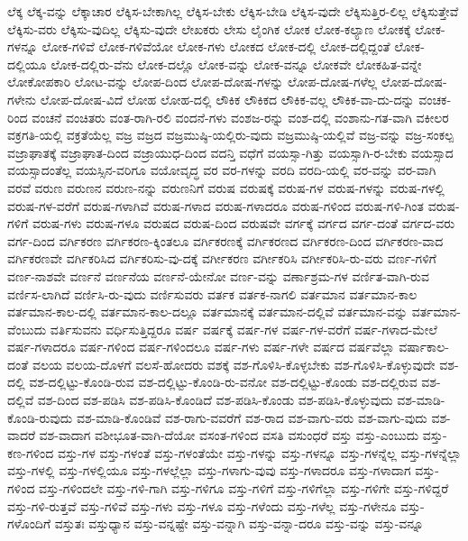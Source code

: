 {ಲೆಕ್ಕ
ಲೆಕ್ಕ-ವನ್ನು
ಲೆಕ್ಕಾಚಾರ
ಲೆಕ್ಕಿಸ-ಬೇಕಾಗಿಲ್ಲ
ಲೆಕ್ಕಿಸ-ಬೇಕು
ಲೆಕ್ಕಿಸ-ಬೇಡಿ
ಲೆಕ್ಕಿಸ-ವುದೇ
ಲೆಕ್ಕಿಸುತ್ತಿರ-ಲಿಲ್ಲ
ಲೆಕ್ಕಿಸುತ್ತೇವೆ
ಲೆಕ್ಕಿಸು-ವರು
ಲೆಕ್ಕಿಸು-ವುದಿಲ್ಲ
ಲೆಕ್ಕಿಸು-ವುದೇ
ಲೇಖಕರು
ಲೇಸು
ಲೈಂಗಿಕ
ಲೋಕ
ಲೋಕ-ಕಲ್ಯಾಣ
ಲೋಕಕ್ಕೆ
ಲೋಕ-ಗಳನ್ನೂ
ಲೋಕ-ಗಳಿವೆ
ಲೋಕ-ಗಳಿವೆಯೋ
ಲೋಕ-ಗಳು
ಲೋಕದ
ಲೋಕ-ದಲ್ಲಿ
ಲೋಕ-ದಲ್ಲಿದ್ದಂತೆ
ಲೋಕ-ದಲ್ಲಿಯೂ
ಲೋಕ-ದಲ್ಲಿರು-ವೆನು
ಲೋಕ-ದಲ್ಲೊ
ಲೋಕ-ವನ್ನು
ಲೋಕ-ವನ್ನೂ
ಲೋಕವೇ
ಲೋಕಹಿತ-ವನ್ನೇ
ಲೋಕೋಪಕಾರಿ
ಲೋಟ-ವನ್ನು
ಲೋಪ-ದಿಂದ
ಲೋಪ-ದೋಷ-ಗಳನ್ನು
ಲೋಪ-ದೋಷ-ಗಳೆಲ್ಲ
ಲೋಪ-ದೋಷ-ಗಳೇನು
ಲೋಪ-ದೋಷ-ವಿದೆ
ಲೋಹ
ಲೋಹ-ದಲ್ಲಿ
ಲೌಕಿಕ
ಲೌಕಿಕದ
ಲೌಕಿಕ-ವಲ್ಲ
ಲೌಕಿಕ-ವಾ-ದು-ದನ್ನು
ವಂಚಕ-ರಿಂದ
ವಂಚನೆ
ವಂಚಿತರು
ವಂತ-ರಾಗಿ-ರಲಿ
ವಂದನೆ-ಗಳು
ವಂಶಜ-ರನ್ನು
ವಂಶ-ದಲ್ಲಿ
ವಂಶಾನು-ಗತ-ವಾಗಿ
ವಕೀಲರ
ವಕ್ರಗತಿ-ಯಲ್ಲಿ
ವಕ್ರತೆಯೆಲ್ಲ
ವಜ್ರ
ವಜ್ರದ
ವಜ್ರಮುಷ್ಠಿ-ಯಲ್ಲಿರು-ವುದು
ವಜ್ರಮುಷ್ಠಿ-ಯಲ್ಲಿವೆ
ವಜ್ರ-ವನ್ನು
ವಜ್ರ-ಸಂಕಲ್ಪ
ವಜ್ರಾಘಾತಕ್ಕೆ
ವಜ್ರಾಘಾತ-ದಿಂದ
ವಜ್ರಾಯುಧ-ದಿಂದ
ವದನ್ತಿ
ವಧೆಗೆ
ವಯಸ್ಸಾ-ಗಿತ್ತು
ವಯಸ್ಸಾಗಿ-ರ-ಬೇಕು
ವಯಸ್ಸಾದ
ವಯಸ್ಸಾದಂತೆಲ್ಲ
ವಯಸ್ಸಿನ-ವರಿಗೂ
ವಯೋವೃದ್ಧ
ವರ
ವರ-ಗಳನ್ನು
ವರದಿ
ವರದಿ-ಯಲ್ಲಿ
ವರ-ವನ್ನು
ವರ-ವಾಗಿ
ವರವೆ
ವರುಣ
ವರುಣನ
ವರುಣ-ನನ್ನು
ವರುಣನಿಗೆ
ವರುಷ
ವರುಷಕ್ಕೆ
ವರುಷ-ಗಳ
ವರುಷ-ಗಳನ್ನು
ವರುಷ-ಗಳಲ್ಲಿ
ವರುಷ-ಗಳ-ವರೆಗೆ
ವರುಷ-ಗಳಾಗಿವೆ
ವರುಷ-ಗಳಾದ
ವರುಷ-ಗಳಾದರೂ
ವರುಷ-ಗಳಿಂದ
ವರುಷ-ಗಳಿ-ಗಿಂತ
ವರುಷ-ಗಳಿಗೆ
ವರುಷ-ಗಳು
ವರುಷ-ಗಳೂ
ವರುಷದ
ವರುಷ-ದಿಂದ
ವರುಷವೇ
ವರ್ಗಕ್ಕೆ
ವರ್ಗದ
ವರ್ಗ-ದಂತೆ
ವರ್ಗದ-ವರು
ವರ್ಗ-ದಿಂದ
ವರ್ಗಿಕರಣ
ವರ್ಗಿಕರಣ-ಕ್ಕಿಂತಲೂ
ವರ್ಗಿಕರಣಕ್ಕೆ
ವರ್ಗಿಕರಣದ
ವರ್ಗಿಕರಣ-ದಿಂದ
ವರ್ಗಿಕರಣ-ವಾದ
ವರ್ಗಿಕರಣವೇ
ವರ್ಗಿಕರಿಸಿದ
ವರ್ಗಿಕರಿಸು-ವು-ದಕ್ಕೆ
ವರ್ಗೀಕರಣ
ವರ್ಗೀಕರಿಸಿ
ವರ್ಗೀಕರಿಸಿ-ರು-ವರು
ವರ್ಣ-ಗಳಿಗೆ
ವರ್ಣ-ನಾಶವೇ
ವರ್ಣನೆ
ವರ್ಣನೆಯ
ವರ್ಣನೆ-ಯೇನೋ
ವರ್ಣ-ವನ್ನು
ವರ್ಣಾಶ್ರಮ-ಗಳ
ವರ್ಣಿತ-ವಾಗಿ-ರುವ
ವರ್ಣಿಸ-ಲಾಗಿದೆ
ವರ್ಣಿಸಿ-ರು-ವುದು
ವರ್ಣಿಸುವರು
ವರ್ತಕ
ವರ್ತಕ-ನಾಗಲಿ
ವರ್ತಮಾನ
ವರ್ತಮಾನ-ಕಾಲ
ವರ್ತಮಾನ-ಕಾಲ-ದಲ್ಲಿ
ವರ್ತಮಾನ-ಕಾಲ-ದಲ್ಲೂ
ವರ್ತಮಾನಕ್ಕೆ
ವರ್ತಮಾನ-ದಲ್ಲಿವೆ
ವರ್ತಮಾನ-ವನ್ನು
ವರ್ತಮಾನ-ವೆಂಬುದು
ವರ್ತಿಸುವನು
ವರ್ಧಿಸುತ್ತಿದ್ದರೂ
ವರ್ಷ
ವರ್ಷಕ್ಕೆ
ವರ್ಷ-ಗಳ
ವರ್ಷ-ಗಳ-ವರೆಗೆ
ವರ್ಷ-ಗಳಾದ-ಮೇಲೆ
ವರ್ಷ-ಗಳಾದರೂ
ವರ್ಷ-ಗಳಿಂದ
ವರ್ಷ-ಗಳಿಂದಲೂ
ವರ್ಷ-ಗಳು
ವರ್ಷ-ಗಳೇ
ವರ್ಷದ
ವರ್ಷವೆಲ್ಲಾ
ವರ್ಷಾಕಾಲ-ದಂತೆ
ವಲಯ
ವಲಯ-ದೊಳಗೆ
ವಲಸೆ-ಹೋದರು
ವಶಕ್ಕೆ
ವಶ-ಗೊಳಿಸಿ-ಕೊಳ್ಳಬೇಕು
ವಶ-ಗೊಳಿಸಿ-ಕೊಳ್ಳುವುದೇ
ವಶ-ದಲ್ಲಿ
ವಶ-ದಲ್ಲಿಟ್ಟು-ಕೊಂಡಿ-ರುವ
ವಶ-ದಲ್ಲಿಟ್ಟು-ಕೊಂಡಿ-ರು-ವನೋ
ವಶ-ದಲ್ಲಿಟ್ಟು-ಕೊಂಡು
ವಶ-ದಲ್ಲಿರುವ
ವಶ-ದಲ್ಲಿವೆ
ವಶ-ದಿಂದ
ವಶ-ಪಡಿಸಿ
ವಶ-ಪಡಿಸಿ-ಕೊಂಡಿದೆ
ವಶ-ಪಡಿಸಿ-ಕೊಂಡು
ವಶ-ಪಡಿಸಿ-ಕೊಳ್ಳುವುದು
ವಶ-ಮಾಡಿ-ಕೊಂಡಿ-ರುವುದು
ವಶ-ಮಾಡಿ-ಕೊಂಡಿವೆ
ವಶ-ರಾಗು-ವವರೆಗೆ
ವಶ-ರಾದ
ವಶ-ವಾಗು-ವರು
ವಶ-ವಾಗು-ವುದು
ವಶ-ವಾದರೆ
ವಶ-ವಾದಾಗ
ವಶೀಭೂತ-ವಾಗಿ-ದೆಯೋ
ವಸಂತ-ಗಳಿಂದ
ವಸತಿ
ವಸುಂಧರೆ
ವಸ್ತು
ವಸ್ತು-ಎಂಬುದು
ವಸ್ತು-ಕಣ-ಗಳಿಂದ
ವಸ್ತು-ಗಳ
ವಸ್ತು-ಗಳಂತೆ
ವಸ್ತು-ಗಳಂತೆಯೇ
ವಸ್ತು-ಗಳನ್ನು
ವಸ್ತು-ಗಳನ್ನೂ
ವಸ್ತು-ಗಳನ್ನೆಲ್ಲ
ವಸ್ತು-ಗಳನ್ನೆಲ್ಲಾ
ವಸ್ತು-ಗಳಲ್ಲಿ
ವಸ್ತು-ಗಳಲ್ಲಿಯೂ
ವಸ್ತು-ಗಳಲ್ಲೆಲ್ಲಾ
ವಸ್ತು-ಗಳಾಗು-ವುವು
ವಸ್ತು-ಗಳಾದರೂ
ವಸ್ತು-ಗಳಾದಾಗ
ವಸ್ತು-ಗಳಿಂದ
ವಸ್ತು-ಗಳಿಂದಲೇ
ವಸ್ತು-ಗಳಿ-ಗಾಗಿ
ವಸ್ತು-ಗಳಿಗೂ
ವಸ್ತು-ಗಳಿಗೆ
ವಸ್ತು-ಗಳಿಗೆಲ್ಲಾ
ವಸ್ತು-ಗಳಿಗೇ
ವಸ್ತು-ಗಳಿದ್ದರೆ
ವಸ್ತು-ಗಳಿ-ರುತ್ತವೆ
ವಸ್ತು-ಗಳಿವೆ
ವಸ್ತು-ಗಳು
ವಸ್ತು-ಗಳೂ
ವಸ್ತು-ಗಳೆಂದು
ವಸ್ತು-ಗಳೆಲ್ಲ
ವಸ್ತು-ಗಳೇನೂ
ವಸ್ತು-ಗಳೊಂದಿಗೆ
ವಸ್ತುತಃ
ವಸ್ತುಧ್ಯಾನ
ವಸ್ತು-ವನ್ನಷ್ಟೇ
ವಸ್ತು-ವನ್ನಾಗಿ
ವಸ್ತು-ವನ್ನಾ-ದರೂ
ವಸ್ತು-ವನ್ನು
ವಸ್ತು-ವನ್ನೂ
}
